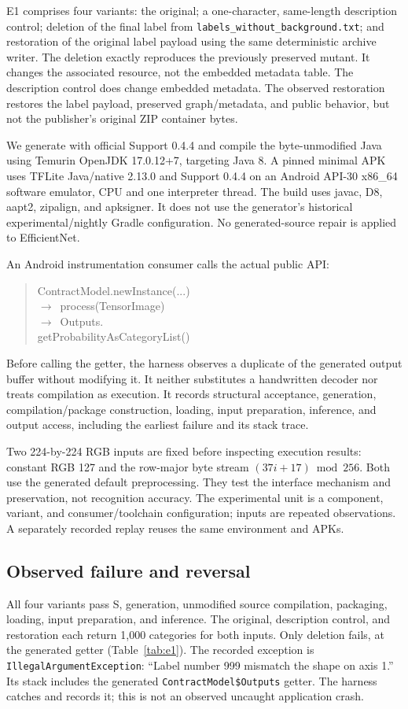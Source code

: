 \documentclass[10pt,twocolumn,letterpaper]{article}
\newcommand{\code}[1]{\texttt{#1}}
\begin{document}
E1 comprises four variants: the original; a one-character, same-length description control; deletion of the final label from \code{labels\_without\_background.txt}; and restoration of the original label payload using the same deterministic archive writer. The deletion exactly reproduces the previously preserved mutant. It changes the associated resource, not the embedded metadata table. The description control does change embedded metadata. The observed restoration restores the label payload, preserved graph/metadata, and public behavior, but not the publisher's original ZIP container bytes.

We generate with official Support 0.4.4 and compile the byte-unmodified Java using Temurin OpenJDK 17.0.12+7, targeting Java 8. A pinned minimal APK uses TFLite Java/native 2.13.0 and Support 0.4.4 on an Android API-30 x86\_64 software emulator, CPU and one interpreter thread. The build uses javac, D8, aapt2, zipalign, and apksigner. It does not use the generator's historical experimental/nightly Gradle configuration. No generated-source repair is applied to EfficientNet.

An Android instrumentation consumer calls the actual public API:
\begin{quote}\small\ttfamily\raggedright
ContractModel.newInstance(...)\\
\quad\(\rightarrow\)\ process(TensorImage)\\
\quad\(\rightarrow\)\ Outputs.\\
\hspace*{1.4em}getProbabilityAsCategoryList()
\end{quote}
Before calling the getter, the harness observes a duplicate of the generated output buffer without modifying it. It neither substitutes a handwritten decoder nor treats compilation as execution. It records structural acceptance, generation, compilation/package construction, loading, input preparation, inference, and output access, including the earliest failure and its stack trace.

Two 224-by-224 RGB inputs are fixed before inspecting execution results: constant RGB 127 and the row-major byte stream $(37i+17)\bmod256$. Both use the generated default preprocessing. They test the interface mechanism and preservation, not recognition accuracy. The experimental unit is a component, variant, and consumer/toolchain configuration; inputs are repeated observations. A separately recorded replay reuses the same environment and APKs.

\subsection{Observed failure and reversal}
All four variants pass S, generation, unmodified source compilation, packaging, loading, input preparation, and inference. The original, description control, and restoration each return 1,000 categories for both inputs. Only deletion fails, at the generated getter (Table~\ref{tab:e1}). The recorded exception is \code{IllegalArgumentException}: ``Label number 999 mismatch the shape on axis 1.'' Its stack includes the generated \code{ContractModel\$Outputs} getter. The harness catches and records it; this is not an observed uncaught application crash.
\end{document}
